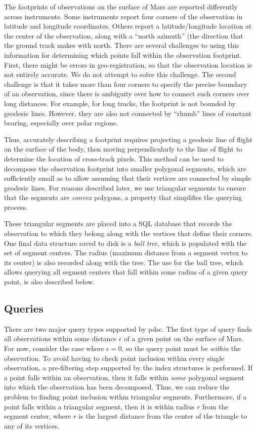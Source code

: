 \documentclass[twocolumn]{extarticle}
\begin{document}
The footprints of observations on the surface of Mars are reported differently
across instruments. Some instruments report four corners of the observation in
latitude and longitude coordinates. Others report a latitude/longitude
location at the center of the observation, along with a ``north azimuth'' (the
direction that the ground track makes with north. There are several challenges
to using this information for determining which points fall within the
observation footprint. First, there might be errors in geo-registration, so that
the observation location is not entirely accurate. We do not attempt to solve
this challenge. The second challenge is that it takes more than four corners to
specify the precise boundary of an observation, since there is ambiguity over
how to connect such corners over long distances. For example, for long tracks,
the footprint is not bounded by geodesic lines. However, they are also not
connected by ``rhumb'' lines of constant bearing, especially over polar regions.

Thus, accurately describing a footprint requires projecting a geodesic line of
flight on the surface of the body, then moving perpendicularly to the line of
flight to determine the location of cross-track pixels. This method can be used
to decompose the observation footprint into smaller polygonal segments, which
are sufficiently small as to allow assuming that their vertices are connected by
simple geodesic lines. For reasons described later, we use triangular segments
to ensure that the segments are \emph{convex} polygons, a property that
simplifies the querying process.

These triangular segments are placed into a SQL database that records the
observation to which they belong along with the vertices that define their
corners. One final data structure saved to disk is a \emph{ball tree}, which is
populated with the set of segment centers. The radius (maximum distance from a
segment vertex to its center) is also recorded along with the tree. The use for
the ball tree, which allows querying all segment centers that fall within some
radius of a given query point, is also described below.

\subsection*{Queries}

There are two major query types supported by \ac{pdsc}. The first type of query
finds all observations within some distance $\epsilon$ of a given point on the
surface of Mars. For now, consider the case where $\epsilon = 0$, so the query
point must be \emph{within} the observation. To avoid having to check point
inclusion within every single observation, a pre-filtering step supported by the
index structures is performed. If a point falls within an observation, then it
falls within \emph{some} polygonal segment into which the observation has been
decomposed. Thus, we can reduce the problem to finding point inclusion within
triangular segments. Furthermore, if a point falls within a triangular segment,
then it is within radius $r$ from the segment center, where $r$ is the largest
distance from the center of the triangle to any of its vertices.
\end{document}
